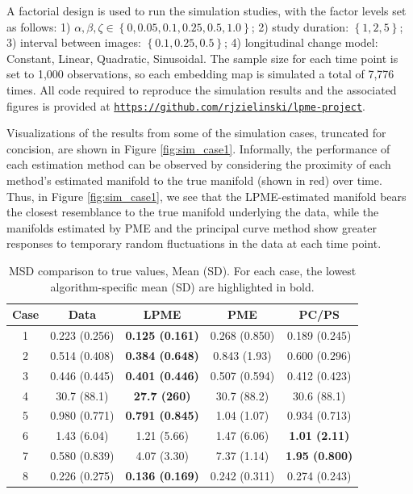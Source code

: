 \documentclass[11pt,reqno]{article}
\theoremstyle{definition}
\begin{document}
A factorial design is used to run the simulation studies, with the factor levels set as follows: 1) $\alpha, \beta, \zeta \in \left\{0, 0.05, 0.1, 0.25, 0.5, 1.0\right\}$; 2) study duration: $\left\{1, 2, 5\right\}$; 3) interval between images: $\left\{0.1, 0.25, 0.5\right\}$; 4) longitudinal change model: Constant, Linear, Quadratic, Sinusoidal. The sample size for each time point is set to 1,000 observations, so each embedding map is simulated a total of 7,776 times. All code required to reproduce the simulation results and the associated figures is provided at \href{https://github.com/rjzielinski/lpme-project}{\texttt{https://github.com/rjzielinski/lpme-project}}.

Visualizations of the results from some of the simulation cases, truncated for concision, are shown in Figure \ref{fig:sim_case1}. Informally, the performance of each estimation method can be observed by considering the proximity of each method's estimated manifold to the true manifold (shown in red) over time. Thus, in Figure \ref{fig:sim_case1}, we see that the LPME-estimated manifold bears the closest resemblance to the true manifold underlying the data, while the manifolds estimated by PME and the principal curve method show greater responses to temporary random fluctuations in the data at each time point.

\begin{table}[h]
  \centering
  \begin{tabular}{|c c c c c|}
    \hline
    Case & Data & LPME & PME & PC/PS \\
    \hline
    1 & 0.223 (0.256) & {\bf 0.125 (0.161)} & 0.268 (0.850) & 0.189 (0.245) \\
    2 & 0.514 (0.408) & {\bf 0.384 (0.648)} & 0.843 (1.93) & 0.600 (0.296) \\
    3 & 0.446 (0.445) & {\bf 0.401 (0.446)} & 0.507 (0.594) & 0.412 (0.423) \\
    4 & 30.7 (88.1) & {\bf 27.7 (260)} & 30.7 (88.2) & 30.6 (88.1) \\
    5 & 0.980 (0.771) & {\bf 0.791 (0.845)} & 1.04 (1.07) & 0.934 (0.713) \\
    6 & 1.43 (6.04) & 1.21 (5.66) & 1.47 (6.06) & {\bf 1.01 (2.11)} \\
    7 & 0.580 (0.839) & 4.07 (3.30) & 7.37 (1.14) & {\bf 1.95 (0.800)} \\
    8 & 0.226 (0.275) & {\bf 0.136 (0.169)} & 0.242 (0.311) & 0.274 (0.243) \\
    \hline
  \end{tabular}
  \caption{MSD comparison to true values, Mean (SD). For each case, the lowest algorithm-specific mean (SD) are highlighted in bold. }
  \label{table:simulation_results_mean}
\end{table}
\end{document}
